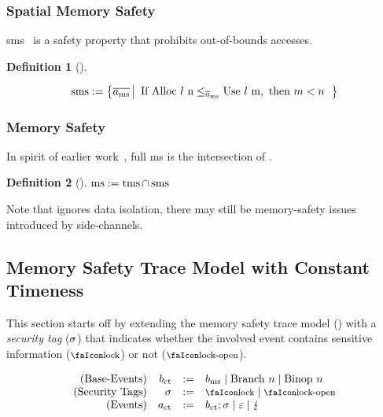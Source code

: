 \documentclass[dvipsnames,conference]{IEEEtran}
\theoremstyle{definition}
\newtheorem{definition}{Definition}[section]
\begin{document}
\subsubsection{Spatial Memory Safety}

\gls*{sms}~\cite{nagarakatte2009soft} is a safety property that prohibits out-of-bounds accesses.

\begin{definition}[]\label{def:trace:smsdef}

  \noindent
  \[
  \smssafe:=\left\{\trace[_{\mssafe}] \left|\begin{array}{rcl}
      \text{If }\ev{Alloc\ \loc\ n}\le_{\trace_{\mssafe}}\ev{Use\ \loc\ m}, \text{ then }m<n
  \end{array}\right.\right\}
  \]
\end{definition}

\subsubsection{Memory Safety}

In spirit of earlier work~\cite{nagarakatte2009soft,nagarakatte2010cets,jim2002cyclone,necula2005ccured,michael2023mswasm}, full \gls*{ms} is the intersection of .

\begin{definition}[]\label{def:trace:msdef}
  $
  \operatorname{ms}:=\operatorname{tms} \cap \operatorname{sms}
  $
\end{definition}

Note that  ignores data isolation, there may still be memory-safety issues introduced by side-channels.

\subsection{Memory Safety Trace Model with Constant Timeness}\label{subsec:scct:tracemodel}

This section starts off by extending the memory safety trace model () with a {\em security tag} ($\sigma$) that indicates whether the involved event contains sensitive information ($\lock$) or not ($\unlock$).

\vspace{-1em}
\[
  \begin{array}{rrcl}
    (\text{Base-Events}) & \preevent[_{\ctsafe}] &:=& \preevent[_{\mssafe}] \mid \ev{Branch\ }n \mid \ev{Binop\ }n\\
    (\text{Security Tags}) & \securitytag &:=& \lock \mid \unlock\\ 
    (\text{Events}) & \event[_{\ctsafe}] &:=& \preevent[_{\ctsafe}];\securitytag \mid \emptyevent \mid \lightning \\ 
  \end{array}
\]
\end{document}
